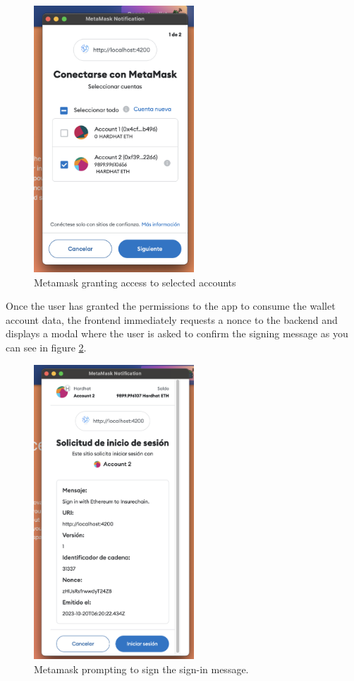 {\begin{figure}[H]
\centering
\includegraphics[width=6cm]{img/results/auth-metamask-connect.png}
\caption[Insurechain: Metamask granting access to selected accounts ]{\footnotesize{Metamask granting access to selected accounts}}
\label{fig:grant-permission-to-wallet}
\end{figure}

Once the user has granted the permissions to the app to consume the wallet account data, the frontend immediately requests a nonce to the backend and displays a modal where the user is asked to confirm the signing message as you can see in figure \ref{fig:metamask-sign-in}.

\begin{figure}[H]
\centering
\includegraphics[width=6cm]{img/results/auth-sign-in.png}
\caption[Insurechain: Metamask prompting to sign the sign-in message ]{\footnotesize{Metamask prompting to sign the sign-in message.}}
\label{fig:metamask-sign-in}
\end{figure}

}
